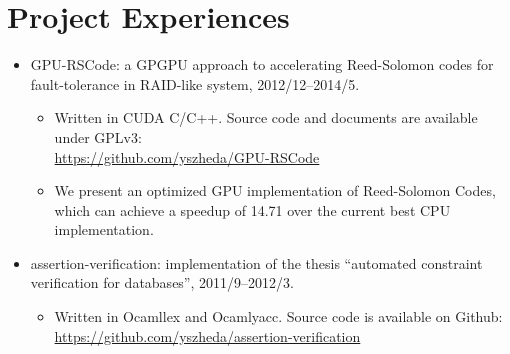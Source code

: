 \documentclass[letterpaper]{article}
\begin{document}
\section*{Project Experiences}
\begin{itemize}
    \item GPU-RSCode: a GPGPU approach to accelerating Reed-Solomon codes for fault-tolerance in RAID-like system, 2012/12--2014/5.
        \begin{itemize}
            \item Written in CUDA C/C++. Source code and documents are available under GPLv3: \\ \url{https://github.com/yszheda/GPU-RSCode}
            \item We present an optimized GPU implementation of Reed-Solomon Codes, which can achieve a speedup of 14.71 over the current best CPU implementation.
        \end{itemize}
    \item assertion-verification: implementation of the thesis ``automated constraint verification for databases'', 2011/9--2012/3.
        \begin{itemize}
            \item Written in Ocamllex and Ocamlyacc. Source code is available on Github: \\ \url{https://github.com/yszheda/assertion-verification}
        \end{itemize}

\end{itemize}
\end{document}
